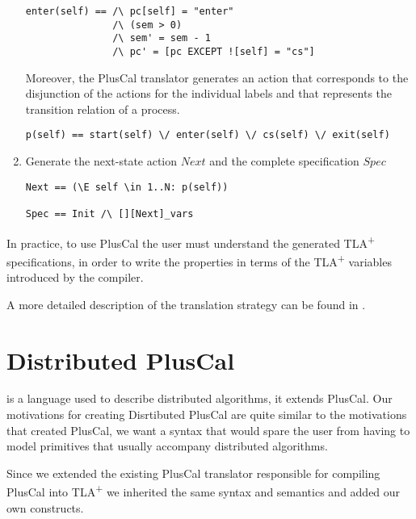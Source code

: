 \documentclass[journal]{IEEEtran}
\newcommand{\tlaplus}{TLA\textsuperscript{+}\xspace}
\begin{document}
\begin{enumerate}
\begin{lstlisting}[frame = tlrb, firstnumber = 1]
enter(self) == /\ pc[self] = "enter"
               /\ (sem > 0)
               /\ sem' = sem - 1
               /\ pc' = [pc EXCEPT ![self] = "cs"]
\end{lstlisting}

Moreover, the PlusCal translator generates an action that corresponds to the disjunction of the actions for the individual labels and that represents the transition relation of a process.

\begin{lstlisting}[frame = tlrb, firstnumber = 1]
p(self) == start(self) \/ enter(self) \/ cs(self) \/ exit(self)
\end{lstlisting}

\item Generate the next-state action $Next$ and the complete specification $Spec$

\begin{lstlisting}[frame = tlrb, firstnumber = 1]
Next == (\E self \in 1..N: p(self))

Spec == Init /\ [][Next]_vars

\end{lstlisting}

\end{enumerate}

In practice, to use PlusCal the user must understand the generated \tlaplus specifications, in order to write the properties in terms of the \tlaplus variables introduced by the compiler.

A more detailed description of the translation strategy can be found in \cite{pcalAlgo}.


\section{Distributed PlusCal}

 is a language used to describe distributed algorithms, it extends PlusCal. 
Our motivations for creating Disrtibuted PlusCal are quite similar to the motivations that created PlusCal, we want a syntax that would spare the user from having to model primitives that usually accompany distributed algorithms.

Since we extended the existing PlusCal translator responsible for compiling PlusCal into \tlaplus we inherited the same syntax and semantics and added our own constructs.
\end{document}
